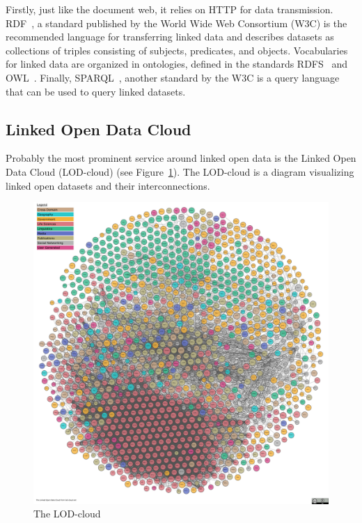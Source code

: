 \documentclass[runningheads]{llncs}
\begin{document}
    Firstly, just like the document web, it relies on HTTP for data transmission.
    RDF~\citep{RDF}, a standard published by the World Wide Web Consortium (W3C) is the recommended language for transferring linked data and describes datasets as collections of triples consisting of subjects, predicates, and objects.
    Vocabularies for linked data are organized in ontologies, defined in the standards RDFS~\citep{RDFS} and OWL~\citep{OWL}.
    Finally, SPARQL~\citep{SPARQL}, another standard by the W3C is a query language that can be used to query linked datasets.

    \subsection{Linked Open Data Cloud}
    Probably the most prominent service around linked open data is the Linked Open Data Cloud (LOD-cloud)
    \footnotemark{} (see Figure~\ref{fig:lod_cloud}).
    The LOD-cloud is a diagram visualizing linked open datasets and their interconnections.

    \begin{figure}[ht]
        \centering
        \includegraphics[width=\textwidth]{figures/lod-cloud-sm}
        \caption{The LOD-cloud\protect\footnotemark[\value{footnote}]}
        \label{fig:lod_cloud}
    \end{figure}
\end{document}
